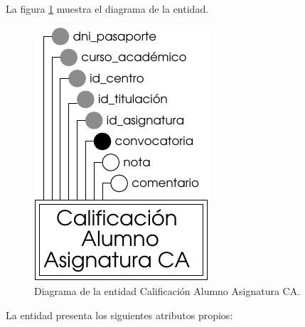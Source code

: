 \begin{description}
   \item[Diagrama] La figura \ref{diagramaCalAlACA} muestra el diagrama de la entidad.
   \item \begin{figure}[!ht]
            \begin{center}
            \includegraphics[]{07.Modelo_Entidad-Interrelacion/7.2.Analisis_Entidades/diagramas/cal_al_aca.pdf}
            \caption{Diagrama de la entidad Calificación Alumno Asignatura CA.}
            \label{diagramaCalAlACA}
            \end{center}
         \end{figure}

   \item[Descripción de los atributos propios] La entidad presenta los
   siguientes atributos propios:


\end{description}
